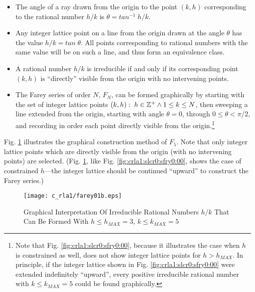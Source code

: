 \begin{itemize}
   \item The angle of a ray drawn from the origin to the point
         $(k,h)$ corresponding to the rational number $h/k$ is
         $\theta = tan^{-1} \; h/k$.

   \item Any integer lattice point on a line from 
         the origin drawn at the angle $\theta$
         has the value $h/k = tan \; \theta$.  All points corresponding
         to rational numbers with the same value will be on such a line,
         and thus form an equivalence class.

   \item A rational number $h/k$ is irreducible if and only if its corresponding
         point $(k,h)$ is ``directly'' visible from the origin with
         no intervening points.

   \item The Farey series of order $N$, $F_N$, can be 
         formed graphically by starting with the
         set of integer lattice points
         $(k,h): \; h \in {\mathbb{Z}^+} \wedge 1 \leq k \leq N$, 
         then sweeping
         a line extended from the origin, starting with 
         angle $\theta = 0$, through
         $0 \leq \theta < \pi{}/2$, and recording 
         in order each point directly visible from
         the origin.\footnote{Note that Fig. \ref{fig:crla1:slcr0:sfry0:00},
         because it illustrates the case when $h$ is constrained
         as well, does not show integer lattice points for
         $h > h_{MAX}$.  In principle, if the integer lattice shown
         in Fig. \ref{fig:crla1:slcr0:sfry0:00} were extended indefinitely
         ``upward'', every positive irreducible rational number with
         $k \leq k_{MAX} = 5$ could be found graphically.}
\end{itemize}

Fig. \ref{fig:crla1:slcr0:sfry0:01} illustrates the graphical construction method
of $F_5$.  Note that only integer lattice points which are directly
visible from the origin (with no intervening points) are selected.
(Fig. \ref{fig:crla1:slcr0:sfry0:01}, like Fig. \ref{fig:crla1:slcr0:sfry0:00},
shows the case of constrained $h$---the integer lattice should be
continued ``upward'' to construct the Farey series.)

\begin{figure}
\centering
\texttt{[image: c\_rla1/farey01b.eps]}
\caption{Graphical Interpretation Of Irreducible Rational Numbers 
         $h/k$ That Can Be Formed With $h \leq h_{MAX}=3$, $k \leq k_{MAX}=5$}
\label{fig:crla1:slcr0:sfry0:01}
\end{figure}

